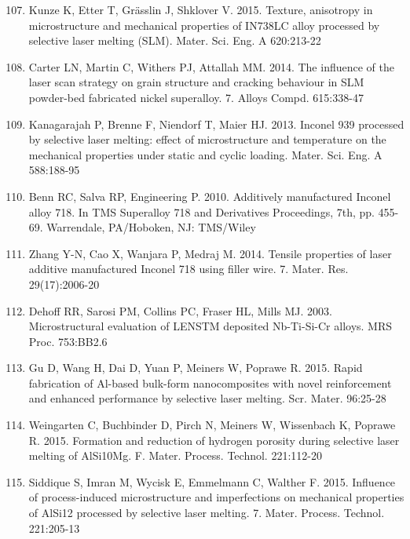 \documentclass[10pt]{article}
\begin{document}
\begin{enumerate}
  \setcounter{enumi}{106}
  \item Kunze K, Etter T, Grässlin J, Shklover V. 2015. Texture, anisotropy in microstructure and mechanical properties of IN738LC alloy processed by selective laser melting (SLM). Mater. Sci. Eng. A 620:213-22

  \item Carter LN, Martin C, Withers PJ, Attallah MM. 2014. The influence of the laser scan strategy on grain structure and cracking behaviour in SLM powder-bed fabricated nickel superalloy. 7. Alloys Compd. 615:338-47

  \item Kanagarajah P, Brenne F, Niendorf T, Maier HJ. 2013. Inconel 939 processed by selective laser melting: effect of microstructure and temperature on the mechanical properties under static and cyclic loading. Mater. Sci. Eng. A 588:188-95

  \item Benn RC, Salva RP, Engineering P. 2010. Additively manufactured Inconel alloy 718. In TMS Superalloy 718 and Derivatives Proceedings, 7th, pp. 455-69. Warrendale, PA/Hoboken, NJ: TMS/Wiley

  \item Zhang Y-N, Cao X, Wanjara P, Medraj M. 2014. Tensile properties of laser additive manufactured Inconel 718 using filler wire. 7. Mater. Res. 29(17):2006-20

  \item Dehoff RR, Sarosi PM, Collins PC, Fraser HL, Mills MJ. 2003. Microstructural evaluation of LENSTM deposited Nb-Ti-Si-Cr alloys. MRS Proc. 753:BB2.6

  \item Gu D, Wang H, Dai D, Yuan P, Meiners W, Poprawe R. 2015. Rapid fabrication of Al-based bulk-form nanocomposites with novel reinforcement and enhanced performance by selective laser melting. Scr. Mater. 96:25-28

  \item Weingarten C, Buchbinder D, Pirch N, Meiners W, Wissenbach K, Poprawe R. 2015. Formation and reduction of hydrogen porosity during selective laser melting of AlSi10Mg. F. Mater. Process. Technol. 221:112-20

  \item Siddique S, Imran M, Wycisk E, Emmelmann C, Walther F. 2015. Influence of process-induced microstructure and imperfections on mechanical properties of AlSi12 processed by selective laser melting. 7. Mater. Process. Technol. 221:205-13


\end{enumerate}
\end{document}
